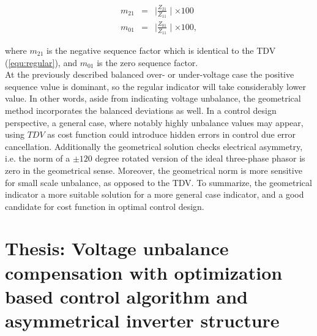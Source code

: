             \begin{equation}
                \begin{array}{rcl}
                       m_{21}&=&\mid\frac{Z_{21}}{Z_{11}}\mid\times100\\
                       m_{01}&=&\mid\frac{Z_{01}}{Z_{11}}\mid\times100,
                \end{array}
                \label{equ:factor}
            \end{equation}

where $m_{21}$ is the negative sequence factor which is identical to the TDV (\ref{equ:regular}), and $m_{01}$ is the zero sequence factor.\\
At the previously described balanced over- or under-voltage case the positive sequence value is dominant, so the regular indicator will take considerably lower value. In other words, aside from indicating voltage unbalance, the geometrical method incorporates the balanced deviations as well. In a control design perspective, a general case, where notably highly unbalance values may appear, using $TDV$ as cost function could introduce hidden errors in control due error cancellation. Additionally the geometrical solution checks electrical asymmetry, i.e. the norm of a $\pm120$ degree rotated version of the ideal three-phase phasor is zero in the geometrical sense. Moreover, the geometrical norm is more sensitive for small scale unbalance, as opposed to the TDV. To summarize, the geometrical indicator a more suitable solution for a more general case indicator, and a good candidate for cost function in optimal control design.

\section{Thesis: Voltage unbalance compensation with optimization based control algorithm and asymmetrical inverter structure}

